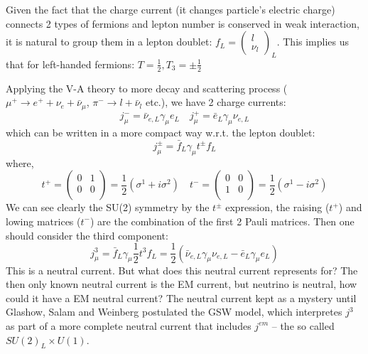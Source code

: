 Given the fact that the charge current (it changes particle's electric charge) 
connects 2 types of fermions and lepton number is conserved in weak interaction, 
it is natural to group them in a lepton doublet: $f_L = \begin{pmatrix} l \\ \nu_l \end{pmatrix}_L$.
This implies us that for left-handed fermions: $T=\frac{1}{2}, T_3 = \pm\frac{1}{2}$ 

Applying the V-A theory to more decay and scattering process (
$\mu^+ \rightarrow e^+ + \nu_e + \bar{\nu}_\mu$, $\pi^- \rightarrow l + \bar{\nu}_l$ etc.), 
we have 2 charge currents:
\begin{equation}
    j_\mu^- = \bar{\nu}_{e, L} \gamma_\mu e_L	\quad 
    j_\mu^+ = \bar{e}_L \gamma_\mu \nu_{e,L}
\end{equation}
which can be written in a more compact way w.r.t. the lepton doublet:
\begin{equation}
    j_\mu^\pm = \bar{f}_L \gamma_\mu t^\pm f_L
\end{equation}
where,
\begin{equation}
    t^+  =
    \begin{pmatrix}
	0   & 1	\\
	0   & 0	\\
    \end{pmatrix}
    = \frac{1}{2}(\sigma^1 + i\sigma^2)
    \quad
    t^-  =
    \begin{pmatrix}
	0   & 0	\\
	1   & 0	\\
    \end{pmatrix}
    = \frac{1}{2}(\sigma^1 - i\sigma^2)
\end{equation}
We can see clearly the SU(2) symmetry by the $t^\pm$ expression, the raising ($t^+$)
and lowing matrices ($t^-$) are the combination of the first 2 Pauli matrices.
Then one should consider the third component:
\begin{equation}
    j_\mu^3 = \bar{f}_L \gamma_\mu \frac{1}{2}t^3 f_L = \frac{1}{2} (\bar{\nu}_{e, L} \gamma_\mu \nu_{e, L} - \bar{e}_{L} \gamma_\mu e_L)
\end{equation}
This is a neutral current. But what does this neutral current represents for?
The then only known neutral current is the EM current, but neutrino is neutral, how
could it have a EM neutral current? The neutral current kept as a mystery until
Glashow, Salam and Weinberg postulated the GSW model, which interpretes $j^3$ as
part of a more complete neutral current that includes $j^{em}$ -- the so called
$SU(2)_L \times U(1)$.

